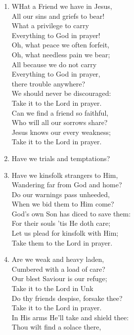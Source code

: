 \documentclass[11pt,a4paper]{article}
\begin{document}
\begin{enumerate}
    \item WHat a Friend we have in Jesus, \\
        All our sins and griefs to bear! \\
        What a privilege to carry \\
        Everything to God in prayer! \\
        Oh, what peace we often forfeit, \\
        Oh, what needless pain we bear; \\
        All because we do not carry \\
        Everything to God in prayer, \\
        there trouble anywhere? \\
        We should never be discouraged: \\
        Take it to the Lord in prayer. \\
        Can we find a friend so faithful, \\
        Who will all our sorrows share? \\
        Jesus knows our every weakness; \\
        Take it to the Lord in prayer.

    \item Have we trials and temptations?

    \item Have we kinsfolk strangers to Him, \\
        Wandering far from God and home? \\
        Do our warnings pass unheeded, \\
        When we bid them to Him come? \\
        God's own Son has diced to save them: \\
        For their souls 'tis He doth care; \\
        Let us plead for kinsfolk with Him; \\
        Take them to the Lord in prayer.

    \item Are we weak and heavy laden, \\
        Cumbered with a load of care? \\
        Our blest Saviour is our refuge; \\
        Take it to the Lord in Unk \\
        Do thy friends despise, forsake thee? \\
        Take it to the Lord in prayer. \\
        In His arms He'll take and shield thee: \\
        Thou wilt find a solace there,

\end{enumerate}
\end{document}
